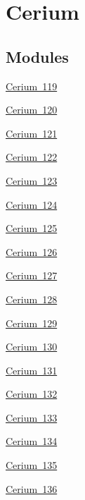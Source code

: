 \hypertarget{group___isotope_const-_cerium}{}\section{Cerium}
\label{group___isotope_const-_cerium}
\subsection*{Modules}
\begin{DoxyCompactItemize}
\item 
\mbox{\hyperlink{group___isotope_const-_cerium-_ce119}{Cerium 119}}
\item 
\mbox{\hyperlink{group___isotope_const-_cerium-_ce120}{Cerium 120}}
\item 
\mbox{\hyperlink{group___isotope_const-_cerium-_ce121}{Cerium 121}}
\item 
\mbox{\hyperlink{group___isotope_const-_cerium-_ce122}{Cerium 122}}
\item 
\mbox{\hyperlink{group___isotope_const-_cerium-_ce123}{Cerium 123}}
\item 
\mbox{\hyperlink{group___isotope_const-_cerium-_ce124}{Cerium 124}}
\item 
\mbox{\hyperlink{group___isotope_const-_cerium-_ce125}{Cerium 125}}
\item 
\mbox{\hyperlink{group___isotope_const-_cerium-_ce126}{Cerium 126}}
\item 
\mbox{\hyperlink{group___isotope_const-_cerium-_ce127}{Cerium 127}}
\item 
\mbox{\hyperlink{group___isotope_const-_cerium-_ce128}{Cerium 128}}
\item 
\mbox{\hyperlink{group___isotope_const-_cerium-_ce129}{Cerium 129}}
\item 
\mbox{\hyperlink{group___isotope_const-_cerium-_ce130}{Cerium 130}}
\item 
\mbox{\hyperlink{group___isotope_const-_cerium-_ce131}{Cerium 131}}
\item 
\mbox{\hyperlink{group___isotope_const-_cerium-_ce132}{Cerium 132}}
\item 
\mbox{\hyperlink{group___isotope_const-_cerium-_ce133}{Cerium 133}}
\item 
\mbox{\hyperlink{group___isotope_const-_cerium-_ce134}{Cerium 134}}
\item 
\mbox{\hyperlink{group___isotope_const-_cerium-_ce135}{Cerium 135}}
\item 
\mbox{\hyperlink{group___isotope_const-_cerium-_ce136}{Cerium 136}}

\end{DoxyCompactItemize}
